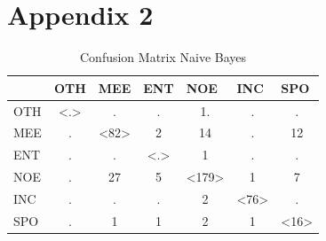 \documentclass[
10pt, %
a4paper, %
oneside, %
headinclude,footinclude, %
BCOR5mm, %
]{scrartcl}
\begin{document}
\section{Appendix 2}
\begin{table}[h]
 \centering
\caption[Confusion Matrix Naive Bayes]{Confusion Matrix Naive Bayes }
\begin{tabular}{|l|c|c|c|c|c|c|}
\hline
    & \multicolumn{1}{l|}{OTH} & \multicolumn{1}{l|}{MEE} & \multicolumn{1}{l|}{ENT} & \multicolumn{1}{l|}{NOE} & \multicolumn{1}{l|}{INC} & \multicolumn{1}{l|}{SPO} \\ \hline
OTH & \textless.\textgreater   & .                        & .                        & 1.                       & .                        & .                        \\ \hline
MEE & .                        & \textless82\textgreater  & 2                        & 14                       & .                        & 12                       \\ \hline
ENT & .                        & .                        & \textless.\textgreater   & 1                        & .                        & .                        \\ \hline
NOE & .                        & 27                       & 5                        & \textless179\textgreater & 1                        & 7                        \\ \hline
INC & .                        & .                        & .                        & 2                        & \textless76\textgreater  & .                        \\ \hline
SPO & .                        & 1                        & 1                        & 2                        & 1                        & \textless16\textgreater  \\ \hline
\end{tabular}
\end{table}
\end{document}

